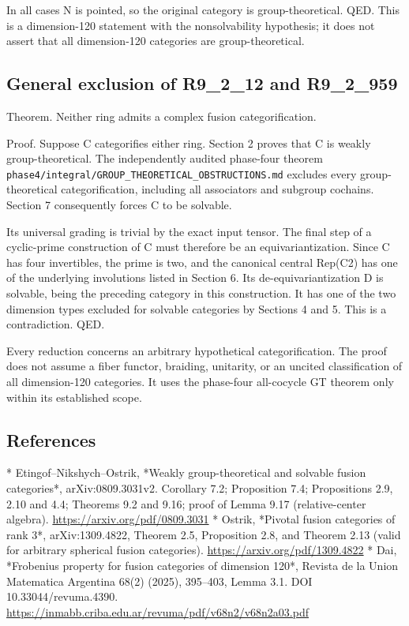 In all cases N is pointed, so the original category is
group-theoretical. QED. This is a dimension-120 statement with the
nonsolvability hypothesis; it does not assert that all dimension-120
categories are group-theoretical.

\hypertarget{general-exclusion-of-r9_2_12-and-r9_2_959}{%
\subsection{General exclusion of R9\_2\_12 and
R9\_2\_959}\label{general-exclusion-of-r9_2_12-and-r9_2_959}}

Theorem. Neither ring admits a complex fusion categorification.

Proof. Suppose C categorifies either ring. Section 2 proves that C is
weakly group-theoretical. The independently audited phase-four theorem
\texttt{phase4\allowbreak{}/\allowbreak{}integr\allowbreak{}al/\allowbreak{}GROUP\_\allowbreak{}THEORE\allowbreak{}TICAL\_\allowbreak{}OBSTRU\allowbreak{}CTIONS\allowbreak{}.\allowbreak{}md}
excludes every group-theoretical categorification, including all
associators and subgroup cochains. Section 7 consequently forces C to be
solvable.

Its universal grading is trivial by the exact input tensor. The final
step of a cyclic-prime construction of C must therefore be an
equivariantization. Since C has four invertibles, the prime is two, and
the canonical central Rep(C2) has one of the underlying involutions
listed in Section 6. Its de-equivariantization D is solvable, being the
preceding category in this construction. It has one of the two dimension
types excluded for solvable categories by Sections 4 and 5. This is a
contradiction. QED.

Every reduction concerns an arbitrary hypothetical categorification. The
proof does not assume a fiber functor, braiding, unitarity, or an
uncited classification of all dimension-120 categories. It uses the
phase-four all-cocycle GT theorem only within its established scope.

\hypertarget{references-1}{%
\subsection{References}\label{references-1}}

* Etingof--Nikshych--Ostrik, *Weakly group-theoretical and solvable
fusion categories*, arXiv:0809.3031v2. Corollary 7.2; Proposition 7.4;
Propositions 2.9, 2.10 and 4.4; Theorems 9.2 and 9.16; proof of Lemma
9.17 (relative-center algebra). \url{https://arxiv.org/pdf/0809.3031} *
Ostrik, *Pivotal fusion categories of rank 3*, arXiv:1309.4822, Theorem
2.5, Proposition 2.8, and Theorem 2.13 (valid for arbitrary spherical
fusion categories). \url{https://arxiv.org/pdf/1309.4822} * Dai,
*Frobenius property for fusion categories of dimension 120*, Revista de
la Union Matematica Argentina 68(2) (2025), 395--403, Lemma 3.1. DOI
10.33044/revuma.4390.
\url{https://inmabb.criba.edu.ar/revuma/pdf/v68n2/v68n2a03.pdf}

